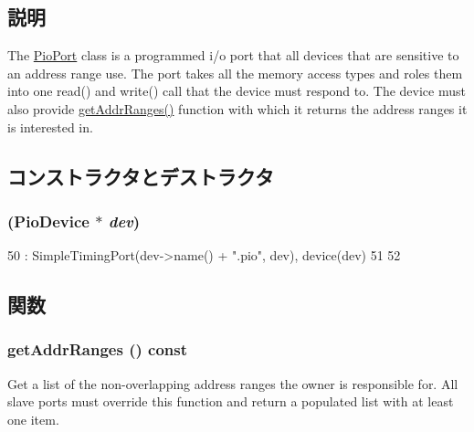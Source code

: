 \subsection{説明}
The \hyperlink{classPioPort}{PioPort} class is a programmed i/o port that all devices that are sensitive to an address range use. The port takes all the memory access types and roles them into one read() and write() call that the device must respond to. The device must also provide \hyperlink{classPioPort_a36cf113d5e5e091ebddb32306c098fae}{getAddrRanges()} function with which it returns the address ranges it is interested in. 

\subsection{コンストラクタとデストラクタ}
\hypertarget{classPioPort_ab40b803a96f5bdefcb721a5baafe34f5}{
\subsubsection[{PioPort}]{ ({\bf PioDevice} $\ast$ {\em dev})}}
\label{classPioPort_ab40b803a96f5bdefcb721a5baafe34f5}



\begin{DoxyCode}
50     : SimpleTimingPort(dev->name() + ".pio", dev), device(dev)
51 {
52 }
\end{DoxyCode}


\subsection{関数}
\hypertarget{classPioPort_a36cf113d5e5e091ebddb32306c098fae}{
\subsubsection[{getAddrRanges}]{ getAddrRanges () const}}
\label{classPioPort_a36cf113d5e5e091ebddb32306c098fae}
Get a list of the non-\/overlapping address ranges the owner is responsible for. All slave ports must override this function and return a populated list with at least one item.

